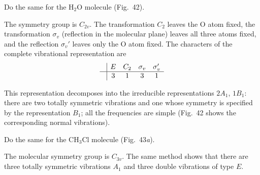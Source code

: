  Do the same for the $\mathrm{H_2O}$ molecule (Fig.~42).

\begin{figure}[ht]
\centering
{}
\caption{}
\end{figure}

\SolutionHeading The symmetry group is $C_{2v}$. The transformation $C_2$ leaves the O atom fixed, the transformation $\sigma_v$ (reflection in the molecular plane) leaves all three atoms fixed, and the reflection $\sigma_v'$ leaves only the O atom fixed. The characters of the complete vibrational representation are
\[
\begin{array}{c|cccc}&E&C_2&\sigma_v&\sigma_v'\\\hline&3&1&3&1\end{array}
\]

This representation decomposes into the irreducible representations $2A_1$, $1B_1$: there are two totally symmetric vibrations and one whose symmetry is specified by the representation $B_1$; all the frequencies are simple (Fig.~42 shows the corresponding normal vibrations).

 Do the same for the $\mathrm{CH_3Cl}$ molecule (Fig.~43\textit{a}).

\SolutionHeading The molecular symmetry group is $C_{3v}$. The same method shows that there are three totally symmetric vibrations $A_1$ and three double vibrations of type $E$.

